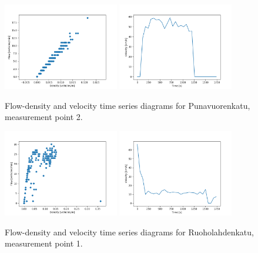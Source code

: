 \documentclass[english, 12pt, a4paper, elec, utf8, pdfa, online]{aaltothesis}
\begin{document}
\clearpage
\begin{figure}[ht!]
    \centering
    \includegraphics[width=0.45\textwidth]{graphs/Punavuorenkatu_2_flw_dns.png}
    \includegraphics[width=0.45\textwidth]{graphs/Punavuorenkatu_2_spd_time_6.png}
    \caption{Flow-density and velocity time series diagrams for Punavuorenkatu, measurement point 2.}
\end{figure}
\begin{figure}[ht!]
    \centering
    \includegraphics[width=0.45\textwidth]{graphs/Ruoholahdenkatu_1_flw_dns.png}
    \includegraphics[width=0.45\textwidth]{graphs/Ruoholahdenkatu_1_spd_time_6.png}
    \caption{ Flow-density and velocity time series diagrams for Ruoholahdenkatu, measurement point 1. }
\end{figure}
\end{document}
